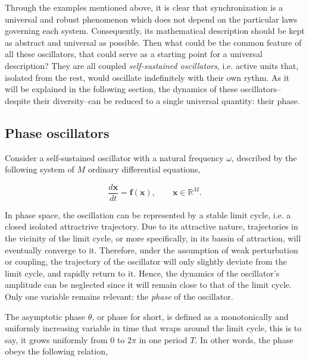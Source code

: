 Through the examples mentioned above, it is clear that synchronization is a universal
and robust phenomenon which does not depend on the particular laws governing each system.
Consequently, its mathematical description should be kept as abstract and universal as possible.
Then what could be the common feature of all these oscillators, that could serve as a starting
point for a universal description? They are all coupled {\em self-sustained oscillators}, i.e. active
units that, isolated from the rest, would oscillate indefinitely with their own rythm. 
As it will be explained in the following section, the dynamics of these oscillators--despite
their diversity--can be reduced to a single universal quantity: their phase.



\subsection{Phase oscillators}
\label{sec:phase_oscillators}

Consider a self-sustained oscillator with a natural frequency $\omega$, described by the following
system of $M$ ordinary differential equations,

\begin{equation}
    \dfrac{d \mathbf{x}}{dt} = \mathbf{f}(\mathbf{x}), \qquad \mathbf{x} \in \mathbb{R}^M.
    \label{eq:pre_phase_osc}
\end{equation}

In phase space, the oscillation can be represented by a stable limit cycle, i.e. 
a closed isolated attractrive trajectory. Due to its attractive nature, trajectories in the vicinity
of the limit cycle, or more specifically, in its bassin of attraction, will eventually converge to it.
Therefore, under the assumption of weak perturbation or coupling, the trajectory of the oscillator will
only slightly deviate from the limit cycle, and rapidly return to it. Hence, the dynamics
of the oscillator's amplitude can be neglected since it will remain close to that of the
limit cycle. Only one variable remains relevant: the {\em phase} of the oscillator.

The asymptotic phase $\theta$, or phase for short, is defined
as a monotonically and uniformly increasing variable in time that wraps around the limit cycle,
this is to say, it grows uniformly from $0$ to $2\pi$ in one period $T$. 
In other words, the phase obeys the following relation,


